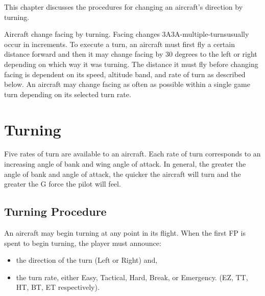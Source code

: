 

This chapter discusses the procedures for changing an aircraft's direction by turning.

Aircraft change facing by turning. Facing changes {3A}{3A-multiple-turns}{usually }occur in  increments. To execute a turn, an aircraft must first fly a certain distance forward and then it may change facing by 30 degrees to the left or right depending on which way it was turning. The distance it must fly before changing facing is dependent on its speed, altitude band, and rate of turn as described below. An aircraft may change facing as often as possible within a single game turn depending on its selected turn rate.

\section{Turning}
\label{rule:turning}


Five rates of turn are available to an aircraft. Each rate of turn corresponds to an increasing angle of bank and wing angle of attack. In general, the greater the angle of bank and angle of attack, the quicker the aircraft will turn and the greater the G force the pilot will feel.

\subsection{Turning Procedure}
An aircraft may begin turning at any point in its flight. When the first FP is spent to begin turning, the player must announce:

\begin{itemize}
    \item the direction of the turn (Left or Right) and,
    \item the turn rate, either Easy, Tactical, Hard, Break, or Emergency. (EZ, TT, HT, BT, ET respectively).
\end{itemize}

